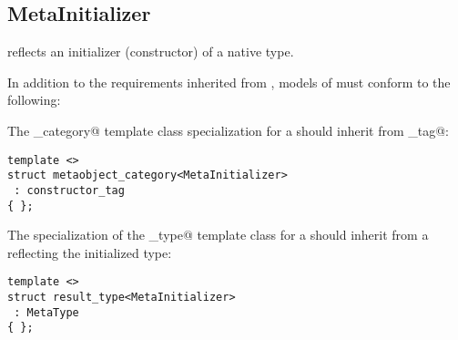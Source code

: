 \subsection{MetaInitializer}
\label{concept-MetaInitializer}

 reflects an initializer (constructor) of a native type.

In addition to the requirements inherited from ,
models of  must conform to the following:

The \verb@metaobject_category@ template class specialization for a  should
inherit from \verb@constructor_tag@:

\begin{verbatim}
template <>
struct metaobject_category<MetaInitializer>
 : constructor_tag
{ };
\end{verbatim}

The specialization of the \verb@result_type@ template class for a  should
inherit from a  reflecting the initialized type:

\begin{verbatim}
template <>
struct result_type<MetaInitializer>
 : MetaType
{ };
\end{verbatim}

